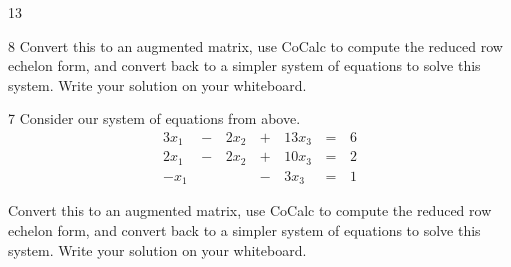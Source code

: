 \begin{applicationActivities}{1}{3}
\begin{activity}{8}
Convert this to an augmented matrix, use CoCalc to compute the reduced row echelon form, and convert back to a simpler system of equations to solve this system.  Write your solution on your whiteboard.
\end{activity}

\begin{activity}{7}
Consider our system of equations from above.
 \[
		\begin{alignedat}{4}
   		  3x_1 &\,-\,& 2x_2 &\,+\,& 13x_3 &\,=\,& 6 \\
   		  2x_1 &\,-\,& 2x_2 &\,+\,& 10x_3 &\,=\,& 2 \\
   		  -x_1 &\,\,&  &\,-\,&  3x_3 &\,=\,&1
   		\end{alignedat} 
\]

Convert this to an augmented matrix, use CoCalc to compute the reduced row echelon form, and convert back to a simpler system of equations to solve this system.  Write your solution on your whiteboard.
\end{activity}



\end{applicationActivities}
